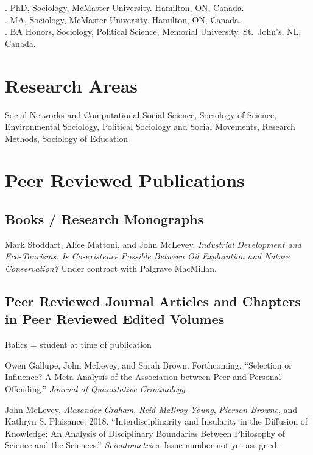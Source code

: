 . PhD, Sociology, McMaster University. Hamilton, ON, Canada.\\
. MA, Sociology, McMaster University. Hamilton, ON, Canada.\\
. BA Honors, Sociology, Political Science, Memorial University.
St.~John's, NL, Canada.

\section{Research Areas}\label{research-areas}

Social Networks and Computational Social Science, Sociology of Science,
Environmental Sociology, Political Sociology and Social Movements,
Research Methods, Sociology of Education

\section{Peer Reviewed Publications}\label{peer-reviewed-publications}

\subsection{Books / Research
Monographs}\label{books-research-monographs}

\ind Mark Stoddart, Alice Mattoni, and John McLevey. \emph{Industrial Development and Eco-Tourisms: Is Co-existence Possible Between Oil Exploration and Nature Conservation?} Under contract with Palgrave MacMillan.

\subsection{Peer Reviewed Journal Articles and Chapters in Peer Reviewed
Edited
Volumes}\label{peer-reviewed-journal-articles-and-chapters-in-peer-reviewed-edited-volumes}

\footnotesize{\ind Italics = student at time of publication}\bigskip
\normalsize

\ind Owen Gallupe, John McLevey, and Sarah Brown. Forthcoming. ``Selection or Influence? A Meta-Analysis of the Association between Peer and Personal Offending.'' \emph{Journal of Quantitative Criminology}.

\ind John McLevey, \emph{Alexander Graham}, \emph{Reid McIlroy-Young}, \emph{Pierson Browne}, and Kathryn S. Plaisance. 2018. ``Interdisciplinarity and Insularity in the Diffusion of Knowledge: An Analysis of Disciplinary Boundaries Between Philosophy of Science and the Sciences.'' \emph{Scientometrics}. Issue number not yet assigned.

